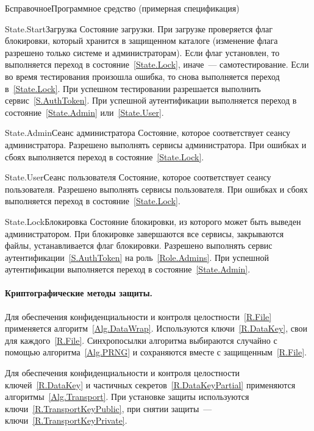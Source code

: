 \begin{appendix}{Б}{справочное}{Программное средство \CryptoDisk 
(примерная спецификация)}
\clearpage
\begin{definition}{State.Start}{Загрузка}
Состояние загрузки. 
При загрузке проверяется флаг блокировки, 
который хранится в защищенном каталоге
(изменение флага разрешено только системе и администраторам).
Если флаг установлен, то выполняется переход в состояние~\ref{State.Lock},
иначе~--- самотестирование.
Если во время тестирования произошла ошибка, 
то снова выполняется переход в~\ref{State.Lock}.
При успешном тестировании разрешается выполнить сервис~\ref{S.AuthToken}.
При успешной аутентификации выполняется переход 
в состояние~\ref{State.Admin} или~\ref{State.User}.
\end{definition}

\begin{definition}{State.Admin}{Сеанс администратора}
Состояние, которое соответствует сеансу администратора.
Разрешено выполнять сервисы администратора.
При ошибках и сбоях выполняется переход в состояние~\ref{State.Lock}.
\end{definition}

\begin{definition}{State.User}{Сеанс пользователя}
Состояние, которое соответствует сеансу пользователя.
Разрешено выполнять сервисы пользователя.
При ошибках и сбоях выполняется переход в состояние~\ref{State.Lock}.
\end{definition}

\begin{definition}{State.Lock}{Блокировка}
Состояние блокировки, из которого \TOE может быть выведен администратором.
При блокировке завершаются все сервисы, закрываются файлы,
устанавливается флаг блокировки.
Разрешено выполнять сервис аутентификации~\ref{S.AuthToken} на роль~\ref{Role.Admins}.
При успешной аутентификации выполняется переход в состояние~\ref{State.Admin}. 
\end{definition}


\paragraph*{Криптографические методы защиты.}
Для обеспечения конфиденциальности и контроля целостности~\ref{R.File} 
применяется алгоритм~\ref{Alg.DataWrap}.
Используются ключи~\ref{R.DataKey}, свои для каждого~\ref{R.File}.
Синхропосылки алгоритма выбираются случайно с помощью алгоритма~\ref{Alg.PRNG}
и сохраняются вместе с защищенным~\ref{R.File}.

Для обеспечения конфиденциальности и контроля целостности 
ключей~\ref{R.DataKey} и частичных секретов~\ref{R.DataKeyPartial}
применяются алгоритмы~\ref{Alg.Transport}.
При установке защиты используются ключи~\ref{R.TransportKeyPublic},
при снятии защиты~--- ключи~\ref{R.TransportKeyPrivate}.


\end{appendix}
